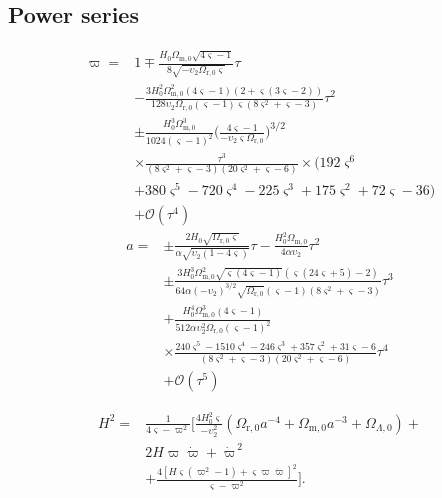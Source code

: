 \documentclass[aps,prd,reprint,preprintnumbers,showpacs,floatfix,nofootinbib,superscriptaddress]{revtex4-2}
\begin{document}
\subsection{Power series}
\begin{equation}
		\begin{align}
				\varpi = & 1 \mp \frac{H_0 \Omega_{\mathrm{m, 0}}\sqrt{4 \varsigma - 1}}{8 \sqrt{- \upsilon_2 \Omega_{\mathrm{r, 0}} \varsigma}} \tau\\
						 & - \frac{3 H_0^2 \Omega_{\mathrm{m, 0}}^2 (4 \varsigma - 1)(2 + \varsigma(3 \varsigma - 2))}{128 \upsilon_2 \Omega_{\mathrm{r, 0}}(\varsigma - 1)\varsigma (8 \varsigma^2 + \varsigma -3)}\tau^2\\
						 & \pm \frac{H_0^3\Omega_\mathrm{m, 0}^3}{1024(\varsigma-1)^2}\Big(\frac{4 \varsigma -1}{- \upsilon_2 \varsigma \Omega_\mathrm{r,0}}\Big)^{3/2} \\ 
						 & \times \frac{\tau^3}{(8 \varsigma^2 + \varsigma -3)(20 \varsigma^2 + \varsigma -6)} \times \Big(192 \varsigma^6 \\
						 &+ 380 \varsigma^5 -720 \varsigma^4 -225 \varsigma^3 +175 \varsigma^2 + 72 \varsigma - 36\Big)\\
						 &+ \mathcal{O}(\tau^4)
		\end{align}
\end{equation}
\begin{equation}
		\begin{align}
				a = & \pm \frac{2 H_0 \sqrt{\Omega_{\mathrm{r,0}} \varsigma}}{\alpha \sqrt{\upsilon_2 (1- 4 \varsigma)}}\tau - \frac{H_0^2 \Omega_\mathrm{m, 0}}{4 \alpha \upsilon_2} \tau^2\\
					& \pm \frac{3 H_0^3 \Omega_{\mathrm{m, 0}}^2 \sqrt{\varsigma (4 \varsigma - 1)}(\varsigma(24 \varsigma + 5) -2)}{64 \alpha (-\upsilon_2)^{3/2} \sqrt{\Omega_{\mathrm{r, 0}}}(\varsigma - 1)(8 \varsigma^2 + \varsigma -3)}\tau^3\\
					& + \frac{H_0^4 \Omega_\mathrm{m,0}^3 (4 \varsigma - 1)}{512 \alpha \upsilon_2^2 \Omega_\mathrm{r,0} (\varsigma - 1)^2}\\
					& \times \frac{240\varsigma^5-1510\varsigma^4-246\varsigma^3+357\varsigma^2+31\varsigma-6}{(8 \varsigma^2 + \varsigma -3)(20 \varsigma^2 + \varsigma -6)}\tau^4\\
					& + \mathcal{O}(\tau^5)
		\end{align}
\end{equation}

\begin{equation}
				  \begin{align}
				  H^2 ={}& \frac{1}{4\varsigma-\varpi^2} \Bigg[ \frac{4H_0^2\varsigma}{-\upsilon_2^2} \left( \Omega_{\mathrm r,0}a^{-4} +\Omega_{\mathrm m,0}a^{-3} +\Omega_{\Lambda,0} \right) + \\
						 &2H\varpi\dot{\varpi} +\dot{\varpi}^{\,2} \nonumber\\ 
						 &+ \frac{ 4\left[ H\varsigma\left(\varpi^2-1\right) +\varsigma\varpi\dot{\varpi} \right]^2 }{ \varsigma-\varpi^2 } \Bigg]. \label{eq:TorCF1} \end{align}
				 \end{equation}
\end{document}
